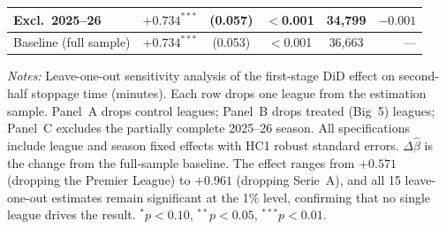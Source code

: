 \begin{table}[htbp]
\begin{threeparttable}
\begin{tabular}{lccccr}
Excl.\ 2025--26          & $+0.734^{***}$ & (0.057) & $<$0.001 & 34,799 & $-0.001$ \\
\midrule
Baseline (full sample)   & $+0.734^{***}$ & (0.053) & $<$0.001 & 36,663 & --- \\
\bottomrule
\end{tabular}
\begin{tablenotes}[flushleft]
\footnotesize
\item \textit{Notes:} Leave-one-out sensitivity analysis of the first-stage DiD effect on
second-half stoppage time (minutes). Each row drops one league from the estimation sample.
Panel~A drops control leagues; Panel~B drops treated (Big~5) leagues; Panel~C excludes the
partially complete 2025--26 season. All specifications include league and season fixed
effects with HC1 robust standard errors. $\Delta\hat{\beta}$ is the change from the
full-sample baseline. The effect ranges from $+0.571$ (dropping the Premier League) to
$+0.961$ (dropping Serie~A), and all 15 leave-one-out estimates remain significant at the
1\% level, confirming that no single league drives the result.
$^{*}p<0.10$, $^{**}p<0.05$, $^{***}p<0.01$.
\end{tablenotes}
\end{threeparttable}
\end{table}
